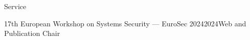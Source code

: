 \documentclass[letterpaper, 12pt]{resume}
\newcommand{\noitemvspace}{\vspace{-4ex}}
\newcommand{\heading}[1]{\textbf{#1:}\xspace}
\begin{document}


\begin{rSection}{Service}
    \begin{rSubsection}{17th European Workshop on Systems Security --- EuroSec 2024}{2024}{Web and Publication Chair}{}
        \item[] \noitemvspace
    \end{rSubsection}
\end{rSection}




\end{document}
